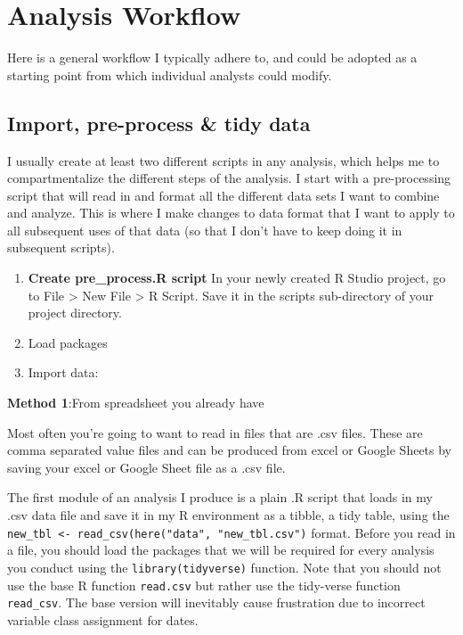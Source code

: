 \documentclass[]{book}
\begin{document}
\section{Analysis Workflow}\label{analysis-workflow}

Here is a general workflow I typically adhere to, and could be adopted
as a starting point from which individual analysts could modify.

\subsection{Import, pre-process \& tidy
data}\label{import-pre-process-tidy-data}

I usually create at least two different scripts in any analysis, which
helps me to compartmentalize the different steps of the analysis. I
start with a pre-processing script that will read in and format all the
different data sets I want to combine and analyze. This is where I make
changes to data format that I want to apply to all subsequent uses of
that data (so that I don't have to keep doing it in subsequent scripts).

\begin{enumerate}
\def\labelenumi{\arabic{enumi})}
\item
  \textbf{Create pre\_process.R script} In your newly created R Studio
  project, go to File \textgreater{} New File \textgreater{} R Script.
  Save it in the scripts sub-directory of your project directory.
\item
  Load packages
\item
  Import data:
\end{enumerate}

\textbf{Method 1}:From spreadsheet you already have

Most often you're going to want to read in files that are .csv files.
These are comma separated value files and can be produced from excel or
Google Sheets by saving your excel or Google Sheet file as a .csv file.

The first module of an analysis I produce is a plain .R script that
loads in my .csv data file and save it in my R environment as a tibble,
a tidy table, using the
\texttt{new\_tbl\ \textless{}-\ read\_csv(here("data",\ "new\_tbl.csv")}
format. Before you read in a file, you should load the packages that we
will be required for every analysis you conduct using the
\texttt{library(tidyverse)} function. Note that you should not use the
base R function \texttt{read.csv} but rather use the tidy-verse function
\texttt{read\_csv}. The base version will inevitably cause frustration
due to incorrect variable class assignment for dates.
\end{document}
